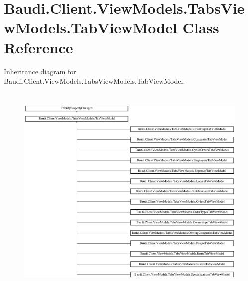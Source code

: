 \hypertarget{class_baudi_1_1_client_1_1_view_models_1_1_tabs_view_models_1_1_tab_view_model}{}\section{Baudi.\+Client.\+View\+Models.\+Tabs\+View\+Models.\+Tab\+View\+Model Class Reference}
\label{class_baudi_1_1_client_1_1_view_models_1_1_tabs_view_models_1_1_tab_view_model}
Inheritance diagram for Baudi.\+Client.\+View\+Models.\+Tabs\+View\+Models.\+Tab\+View\+Model\+:\begin{figure}[H]
\begin{center}
\leavevmode
\includegraphics[height=10.484582cm]{class_baudi_1_1_client_1_1_view_models_1_1_tabs_view_models_1_1_tab_view_model}
\end{center}
\end{figure}
